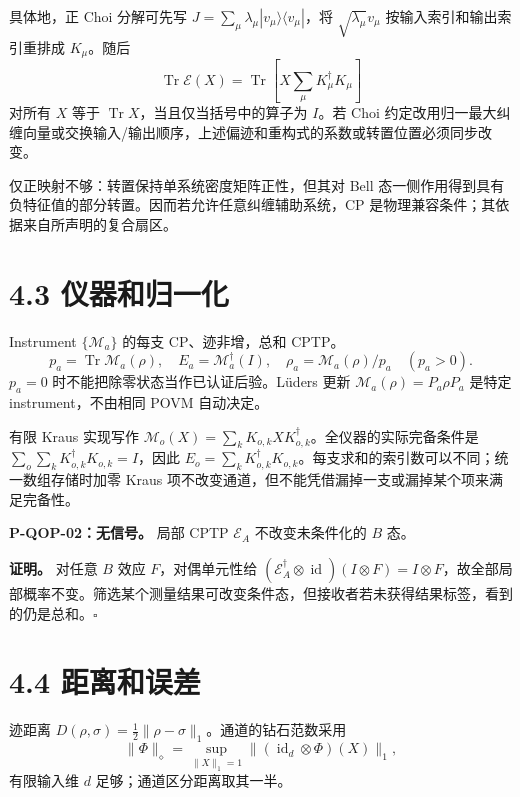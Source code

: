 \documentclass[
  11pt,
  oneside]{book}
\begin{document}
具体地，正 Choi 分解可先写
\(J=\sum_\mu\lambda_\mu|v_\mu\rangle\langle v_\mu|\)，将
\(\sqrt{\lambda_\mu}v_\mu\) 按输入索引和输出索引重排成 \(K_\mu\)。随后
\[
\operatorname{Tr}\mathcal E(X)
=\operatorname{Tr}\left[X\sum_\mu K_\mu^\dagger K_\mu\right]
\] 对所有 \(X\) 等于 \(\operatorname{Tr}X\)，当且仅当括号中的算子为
\(I\)。若 Choi
约定改用归一最大纠缠向量或交换输入/输出顺序，上述偏迹和重构式的系数或转置位置必须同步改变。

仅正映射不够：转置保持单系统密度矩阵正性，但其对 Bell
态一侧作用得到具有负特征值的部分转置。因而若允许任意纠缠辅助系统，CP
是物理兼容条件；其依据来自所声明的复合扇区。

\section{4.3 仪器和归一化}

Instrument \(\{\mathcal M_a\}\) 的每支 CP、迹非增，总和 CPTP。 \[
p_a=\operatorname{Tr}\mathcal M_a(\rho),\quad
E_a=\mathcal M_a^\dagger(I),\quad
\rho_a=\mathcal M_a(\rho)/p_a\quad(p_a>0).
\] \(p_a=0\) 时不能把除零状态当作已认证后验。Lüders 更新
\(\mathcal M_a(\rho)=P_a\rho P_a\) 是特定 instrument，不由相同 POVM
自动决定。

有限 Kraus 实现写作
\(\mathcal M_o(X)=\sum_kK_{o,k}XK_{o,k}^\dagger\)。全仪器的实际完备条件是
\(\sum_o\sum_kK_{o,k}^\dagger K_{o,k}=I\)，因此
\(E_o=\sum_kK_{o,k}^\dagger K_{o,k}\)。每支求和的索引数可以不同；统一数组存储时加零
Kraus 项不改变通道，但不能凭借漏掉一支或漏掉某个项来满足完备性。

\protect\hypertarget{p-qop-02}{}{}

\textbf{P-QOP-02：无信号。} 局部 CPTP \(\mathcal E_A\) 不改变未条件化的
\(B\) 态。

\textbf{证明。} 对任意 \(B\) 效应 \(F\)，对偶单元性给
\((\mathcal E_A^\dagger\otimes\operatorname{id})(I\otimes F)=I\otimes F\)，故全部局部概率不变。筛选某个测量结果可改变条件态，但接收者若未获得结果标签，看到的仍是总和。\(\square\)

\section{4.4 距离和误差}

迹距离 \(D(\rho,\sigma)=\frac12\|\rho-\sigma\|_1\)。通道的钻石范数采用
\[
\|\Phi\|_\diamond=\sup_{\|X\|_1=1}
\|(\operatorname{id}_d\otimes\Phi)(X)\|_1,
\] 有限输入维 \(d\) 足够；通道区分距离取其一半。

\protect\hypertarget{p-qop-03}{}{}
\end{document}
